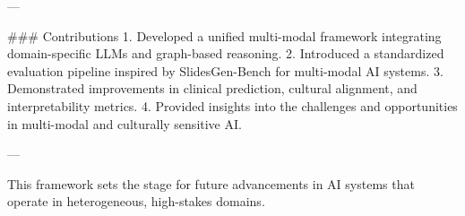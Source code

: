 ---

### Contributions  
1. Developed a unified multi-modal framework integrating domain-specific LLMs and graph-based reasoning.  
2. Introduced a standardized evaluation pipeline inspired by SlidesGen-Bench for multi-modal AI systems.  
3. Demonstrated improvements in clinical prediction, cultural alignment, and interpretability metrics.  
4. Provided insights into the challenges and opportunities in multi-modal and culturally sensitive AI.  

--- 

This framework sets the stage for future advancements in AI systems that operate in heterogeneous, high-stakes domains.